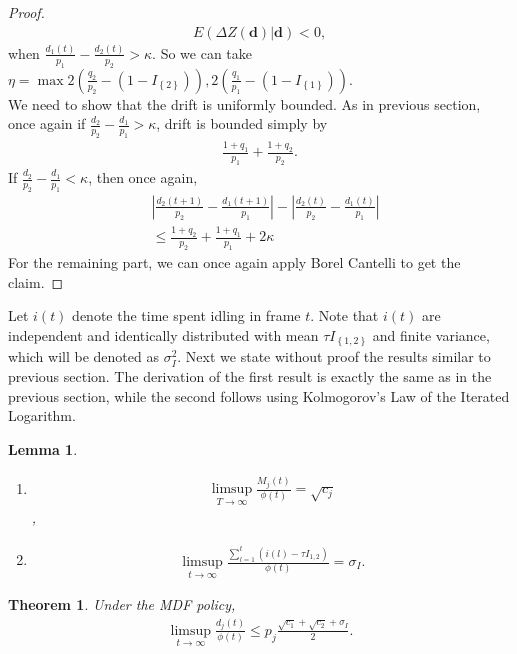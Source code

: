 \documentclass[letterpaper, 10 pt, conference]{ieeeconf}
\newtheorem{lemma}{Lemma}
\newtheorem{theorem}{Theorem}
\begin{document}
\begin{proof}
\begin{align*}
E( \Delta Z(\bm{d}) | \bm{d}  )<0,
\end{align*}
 when $\frac{d_{1}(t)}{p_{1}} - \frac{d_{2}(t)}{p_{2}}>\kappa$. 
So we can take $\eta = \max{2\left( \frac{q_{2}}{p_{2}} - \left(1-I_{\left\{2\right\}}\right)   \right), 2\left( \frac{q_{1}}{p_{1}} - \left(1-I_{\left\{1\right\}}\right)   \right)}$.\\ 
We need to show that the drift is uniformly bounded. As in previous section, once again if $ \frac{d_{2} }{p_{2}}- \frac{d_{1}}{p_{1}} > \kappa$, drift is bounded simply by 
\begin{align*}
\frac{1+q_{1}}{p_{1}} + \frac{1+q_{2}}{p_{2}} .
\end{align*}
If $ \frac{d_{2} }{p_{2}}- \frac{d_{1}}{p_{1}} < \kappa$, then once again,
\begin{align*}
&\left| \frac{d_{2}(t+1)}{p_{2}}	- \frac{d_{1}(t+1)}{p_{1}}\right| - \left| \frac{d_{2}(t)}{p_{2}}	- \frac{d_{1}(t)}{p_{1}}\right| \\
&\leq \frac{1+q_{2}}{p_{2}} + \frac{1+q_{1}}{p_{1}} +2\kappa
\end{align*}
For the remaining part, we can once again apply Borel Cantelli to get the claim.
\end{proof}
Let $i(t)$ denote the time spent idling in frame $t$. Note that $i(t)$ are independent and identically distributed with mean $\tau I_{\left\{1,2\right\}}$ and finite variance, which will be denoted as $\sigma^{2}_{I}$. Next we state without proof the results similar to previous section. The derivation of the first result is exactly the same as in the previous section, while the second follows using Kolmogorov's Law of the Iterated Logarithm.
\begin{lemma}
\begin{enumerate}
\item 
\begin{align*}
 \limsup_{T\to\infty} \frac{M_{j}(t)}{\phi(t)} = \sqrt{c_{j}}
\end{align*},
\item 
\begin{align*}
\limsup_{t\to\infty} \frac{\sum_{l=1}^{t} \left(i(l) -\tau I_{1,2}\right)}{\phi(t)} = \sigma_{I}.
\end{align*}
\end{enumerate}

\end{lemma} 
\begin{theorem}\label{theorem:main1}
Under the MDF policy, 
\begin{align}
\limsup_{t\to\infty}\frac{d_{j}(t)}{\phi(t)} \leq p_{j} \frac{\sqrt{c_{1}} + \sqrt{c_{2}} + \sigma_{I} }{2} .
\end{align}
\end{theorem}
\end{document}
